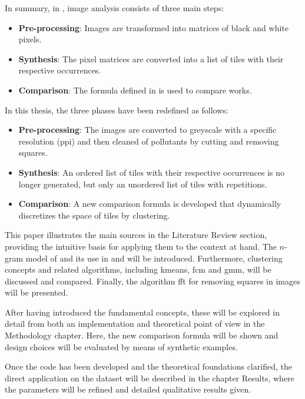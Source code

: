\begin{toReview}
		\bigskip \noindent In summary, in \cite{thesis}, image analysis consists of three main steps:

		\begin{itemize}
			\item \textbf{Pre-processing}: Images are transformed into matrices of black and white pixels.
			\item \textbf{Synthesis}: The pixel matrices are converted into a list of tiles with their respective occurrences.
			\item \textbf{Comparison}: The formula defined in \cite{SapAttribution} is used to compare works.
		\end{itemize}

		\noindent In this thesis, the three phases have been redefined as follows:

		\begin{itemize}
			\item \textbf{Pre-processing}: The images are converted to greyscale with a specific resolution (\gls{ppi}) and then cleaned of pollutants by cutting and removing squares.
			\item \textbf{Synthesis}: An ordered list of tiles with their respective occurrences is no longer generated, but only an unordered list of tiles with repetitions.
			\item \textbf{Comparison}: A new comparison formula is developed that dynamically discretizes the space of tiles by clustering.
		\end{itemize}

		\noindent This paper illustrates the main sources in the Literature Review section, providing the intuitive basis for applying them to the context at hand. The $n$-gram model of \citet{Shannon_ngrammodel} and its use in \cite{SapAttribution} and \cite{thesis} will be introduced. Furthermore, clustering concepts and related algorithms, including \gls{kmeans}, \gls{fcm} and \gls{gmm}, will be discussed and compared. Finally, the algorithm \gls{fft} for removing squares in images will be presented.

		\noindent After having introduced the fundamental concepts, these will be explored in detail from both an implementation and theoretical point of view in the Methodology chapter. Here, the new comparison formula will be shown and design choices will be evaluated by means of synthetic examples.

		\noindent Once the code has been developed and the theoretical foundations clarified, the direct application on the dataset will be described in the chapter Results, where the parameters will be refined and detailed qualitative results given.


\end{toReview}
